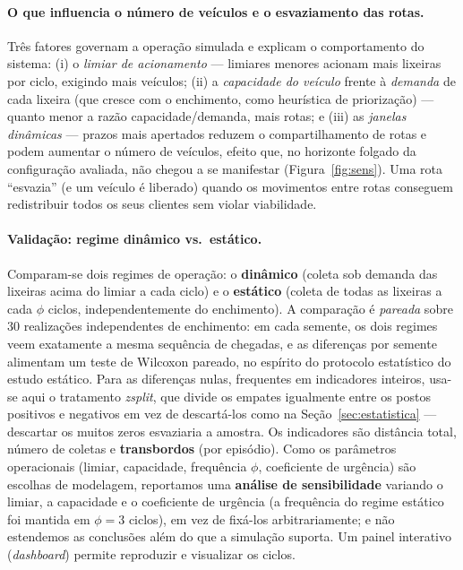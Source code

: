 \documentclass[12pt, a4paper]{article}
\begin{document}
\paragraph{O que influencia o número de veículos e o esvaziamento das rotas.} Três fatores governam a operação simulada e explicam o comportamento do sistema: (i) o \emph{limiar de acionamento} --- limiares menores acionam mais lixeiras por ciclo, exigindo mais veículos; (ii) a \emph{capacidade do veículo} frente à \emph{demanda} de cada lixeira (que cresce com o enchimento, como heurística de priorização) --- quanto menor a razão capacidade/demanda, mais rotas; e (iii) as \emph{janelas dinâmicas} --- prazos mais apertados reduzem o compartilhamento de rotas e podem aumentar o número de veículos, efeito que, no horizonte folgado da configuração avaliada, não chegou a se manifestar (Figura~\ref{fig:sens}). Uma rota ``esvazia'' (e um veículo é liberado) quando os movimentos entre rotas conseguem redistribuir todos os seus clientes sem violar viabilidade.

\paragraph{Validação: regime dinâmico vs.\ estático.} Comparam-se dois regimes de operação: o \textbf{dinâmico} (coleta sob demanda das lixeiras acima do limiar a cada ciclo) e o \textbf{estático} (coleta de todas as lixeiras a cada $\phi$ ciclos, independentemente do enchimento). A comparação é \emph{pareada} sobre $30$ realizações independentes de enchimento: em cada semente, os dois regimes veem exatamente a mesma sequência de chegadas, e as diferenças por semente alimentam um teste de Wilcoxon pareado, no espírito do protocolo estatístico do estudo estático. Para as diferenças nulas, frequentes em indicadores inteiros, usa-se aqui o tratamento \textit{zsplit}, que divide os empates igualmente entre os postos positivos e negativos em vez de descartá-los como na Seção~\ref{sec:estatistica} --- descartar os muitos zeros esvaziaria a amostra. Os indicadores são distância total, número de coletas e \textbf{transbordos} (por episódio). Como os parâmetros operacionais (limiar, capacidade, frequência $\phi$, coeficiente de urgência) são escolhas de modelagem, reportamos uma \textbf{análise de sensibilidade} variando o limiar, a capacidade e o coeficiente de urgência (a frequência do regime estático foi mantida em $\phi=3$ ciclos), em vez de fixá-los arbitrariamente; e não estendemos as conclusões além do que a simulação suporta. Um painel interativo (\textit{dashboard}) permite reproduzir e visualizar os ciclos.
\end{document}
